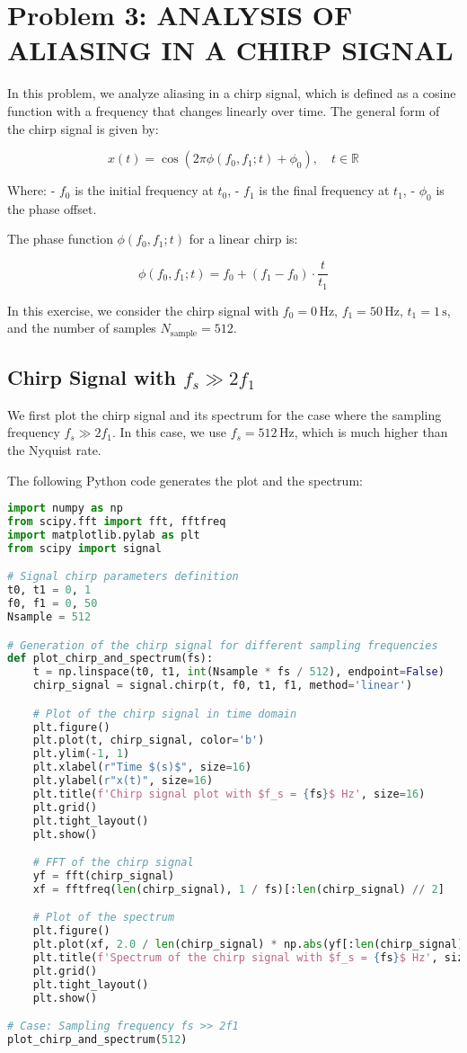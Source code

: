 \documentclass[10pt]{article}
\theoremstyle{definition}
\theoremstyle{remark}
\theoremstyle{definition}
\numberwithin{equation}{prob}
\begin{document}
\section{Problem 3: ANALYSIS OF ALIASING IN A CHIRP SIGNAL}
In this problem, we analyze aliasing in a chirp signal, which is defined as a cosine function with a frequency that changes linearly over time. The general form of the chirp signal is given by:

\[
x(t) = \cos\left( 2\pi \phi(f_0, f_1; t) + \phi_0 \right), \quad t \in \mathbb{R}
\]

Where:
- \( f_0 \) is the initial frequency at \( t_0 \),
- \( f_1 \) is the final frequency at \( t_1 \),
- \( \phi_0 \) is the phase offset.

The phase function \( \phi(f_0, f_1; t) \) for a linear chirp is:

\[
\phi(f_0, f_1; t) = f_0 + (f_1 - f_0) \cdot \frac{t}{t_1}
\]

In this exercise, we consider the chirp signal with \( f_0 = 0 \, \text{Hz} \), \( f_1 = 50 \, \text{Hz} \), \( t_1 = 1 \, \text{s} \), and the number of samples \( N_{\text{sample}} = 512 \).

\subsection{Chirp Signal with \( f_s \gg 2f_1 \)}
We first plot the chirp signal and its spectrum for the case where the sampling frequency \( f_s \gg 2f_1 \). In this case, we use \( f_s = 512 \, \text{Hz} \), which is much higher than the Nyquist rate.

The following Python code generates the plot and the spectrum:

\begin{lstlisting}[language=Python]
import numpy as np
from scipy.fft import fft, fftfreq
import matplotlib.pylab as plt
from scipy import signal

# Signal chirp parameters definition
t0, t1 = 0, 1
f0, f1 = 0, 50
Nsample = 512

# Generation of the chirp signal for different sampling frequencies
def plot_chirp_and_spectrum(fs):
    t = np.linspace(t0, t1, int(Nsample * fs / 512), endpoint=False)
    chirp_signal = signal.chirp(t, f0, t1, f1, method='linear')

    # Plot of the chirp signal in time domain
    plt.figure()
    plt.plot(t, chirp_signal, color='b')
    plt.ylim(-1, 1)
    plt.xlabel(r"Time $(s)$", size=16)
    plt.ylabel(r"x(t)", size=16)
    plt.title(f'Chirp signal plot with $f_s = {fs}$ Hz', size=16)
    plt.grid()
    plt.tight_layout()
    plt.show()

    # FFT of the chirp signal
    yf = fft(chirp_signal)
    xf = fftfreq(len(chirp_signal), 1 / fs)[:len(chirp_signal) // 2]

    # Plot of the spectrum
    plt.figure()
    plt.plot(xf, 2.0 / len(chirp_signal) * np.abs(yf[:len(chirp_signal) // 2]), color='b')
    plt.title(f'Spectrum of the chirp signal with $f_s = {fs}$ Hz', size=16)
    plt.grid()
    plt.tight_layout()
    plt.show()

# Case: Sampling frequency fs >> 2f1
plot_chirp_and_spectrum(512)
\end{lstlisting}
\end{document}
